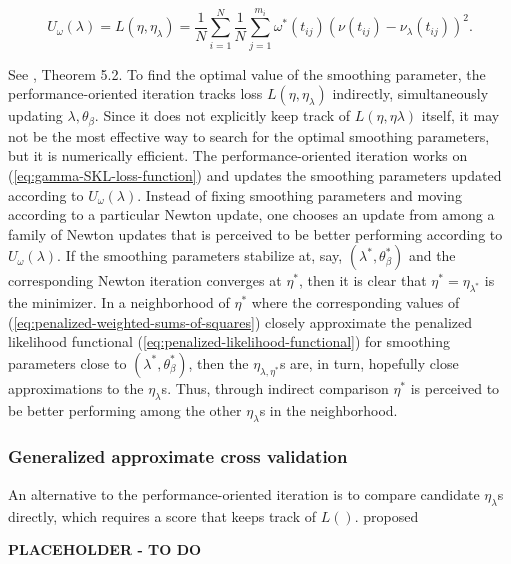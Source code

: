 \begin{equation}\label{eq:weighted-unbiased-risk-estimate}
U_\omega\left( \lambda \right) = L\left( \eta,\eta_\lambda \right) = \frac{1}{N}\sum_{i=1}^N \frac{1}{N}\sum_{j=1}^{m_i} \omega^*\left(t_{ij}\right)  \left( \nu\left(t_{ij}\right) - \nu_\lambda\left(t_{ij}\right)\right)^2.
\end{equation}

\noindent
See \cite{gu2013smoothing}, Theorem 5.2. To find the optimal value of the smoothing parameter, the performance-oriented iteration tracks loss $L\left(\eta, \eta_\lambda \right)$ indirectly, simultaneously updating $\lambda, \theta_\beta$. Since it does not explicitly keep track of $L\left(\eta, \eta\lambda\right)$ itself, it may not be the most effective way to search for the optimal smoothing parameters, but it is numerically efficient. The performance-oriented iteration works on (\ref{eq:gamma-SKL-loss-function}) and updates the smoothing parameters updated according to $U_\omega\left( \lambda \right)$. Instead of fixing smoothing parameters and moving according to a particular Newton update, one chooses an update from among a family of Newton updates that is perceived to be better performing according to $U_\omega\left(\lambda\right)$. If the smoothing parameters stabilize at, say, $\left(\lambda^*,\theta^*_\beta\right)$ and the corresponding Newton iteration converges at $\eta^*$, then it is clear that $\eta^* = \eta_{\lambda^*}$ is the minimizer. In a neighborhood of $\eta^*$ where the corresponding values of (\ref{eq:penalized-weighted-sums-of-squares}) closely approximate the penalized likelihood functional (\ref{eq:penalized-likelihood-functional}) for smoothing parameters close to $\left( \lambda^*, \theta^*_\beta \right)$, then the $\eta_{\lambda, \eta^*}$s are, in turn, hopefully close approximations to the $\eta_\lambda$s. Thus, through indirect comparison $\eta^*$ is perceived to be better performing among the other $\eta_\lambda$s in the neighborhood.

\bigskip


\subsubsection{Generalized approximate cross validation}

An alternative to the performance-oriented iteration is to compare candidate $\eta_\lambda$s directly, which requires a score that keeps track of $L\left(\right)$. \cite{xiang1996generalized} proposed 





































\vspace{1in}
{\textbf{PLACEHOLDER - TO DO}}
\vspace{1in}




%
%
%
